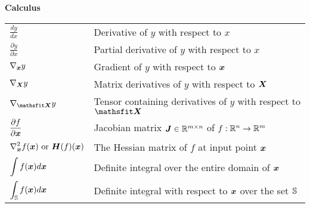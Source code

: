 \documentclass[10pt]{article} %
\begin{document}
\centerline{\bf Calculus}
\bgroup
\def\arraystretch{1.5}
\begin{tabular}{p{1.25in}p{3.25in}}
  $\displaystyle\frac{d y} {d x}$                            & Derivative of $y$ with respect to $x$                                  \\ [2ex]
  $\displaystyle \frac{\partial y} {\partial x} $            & Partial derivative of $y$ with respect to $x$                          \\
  $\displaystyle \nabla_{\bm{x}} y $                              & Gradient of $y$ with respect to ${\bm{x}}$                                  \\
  $\displaystyle \nabla_{\bm{X}} y $                              & Matrix derivatives of $y$ with respect to ${\bm{X}}$                        \\
  $\displaystyle \nabla_\tX y $                              & Tensor containing derivatives of $y$ with respect to $\tX$             \\
  $\displaystyle \frac{\partial f}{\partial {\bm{x}}} $           & Jacobian matrix ${\bm{J}} \in \mathbb{R}^{m\times n}$ of $f: \mathbb{R}^n \rightarrow \mathbb{R}^m$ \\
  $\displaystyle \nabla_{\bm{x}}^2 f({\bm{x}})\text{ or }{\bm{H}}( f)({\bm{x}})$ & The Hessian matrix of $f$ at input point ${\bm{x}}$                         \\
  $\displaystyle \int f({\bm{x}}) d{\bm{x}} $                          & Definite integral over the entire domain of ${\bm{x}}$                      \\
  $\displaystyle \int_{\mathbb{S}} f({\bm{x}}) d{\bm{x}}$                       & Definite integral with respect to ${\bm{x}}$ over the set ${\mathbb{S}}$             \\
\end{tabular}
\egroup
\vspace{0.25cm}
\end{document}
